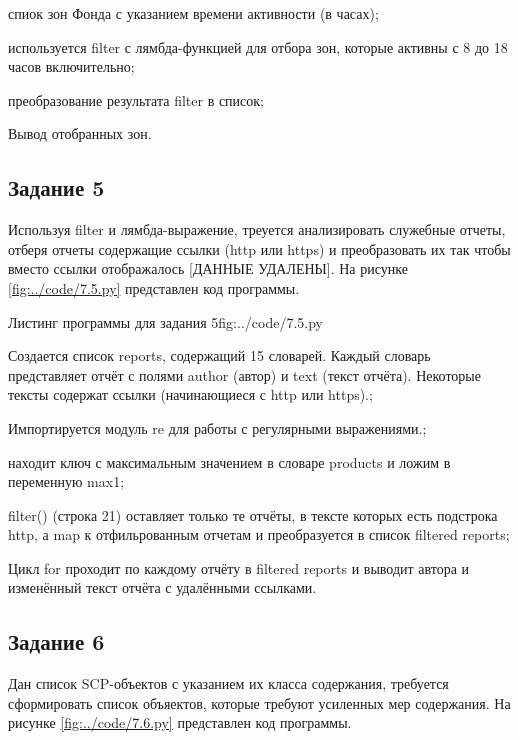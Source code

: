 \documentclass{vvsu}
\begin{document}
\begin{vvsu_list}
  \item спиок зон Фонда с указанием времени активности (в часах);
  \item используется filter с лямбда-функцией для отбора зон, которые активны с 8 до 18 часов включительно;
  \item преобразование результата filter в список;
\end{vvsu_list}
  Вывод отобранных зон.

\subsection{Задание 5}
  Используя filter и лямбда-выражение, треуется анализировать служебные отчеты, отберя отчеты содержащие ссылки (http или https) и преобразовать их так чтобы вместо ссылки отображалось [ДАННЫЕ УДАЛЕНЫ].
На рисунке \ref{fig:../code/7.5.py} представлен код программы.

\begin{vvsu_figure}{Листинг программы для задания 5}{fig:../code/7.5.py}
  \begin{minipage}{.75\textwidth}
    
  \end{minipage}
\end{vvsu_figure}

\begin{vvsu_list}
  \item Создается список reports, содержащий 15 словарей. Каждый словарь представляет отчёт с полями author (автор) и text (текст отчёта). Некоторые тексты содержат ссылки (начинающиеся с http или https).;
  \item Импортируется модуль re для работы с регулярными выражениями.;
  \item находит ключ с максимальным значением в словаре products и ложим в переменную max1;
  \item filter() (строка 21) оставляет только те отчёты, в тексте которых есть подстрока http, а map к отфильрованным отчетам и преобразуется в список filtered reports;
\end{vvsu_list}
  Цикл for проходит по каждому отчёту в filtered reports и выводит автора и изменённый текст отчёта с удалёнными ссылками.

\subsection{Задание 6}
  Дан список SCP-объектов с указанием их класса содержания, требуется сформировать список объяектов, которые требуют усиленных мер содержания.
На рисунке \ref{fig:../code/7.6.py} представлен код программы.
\end{document}
